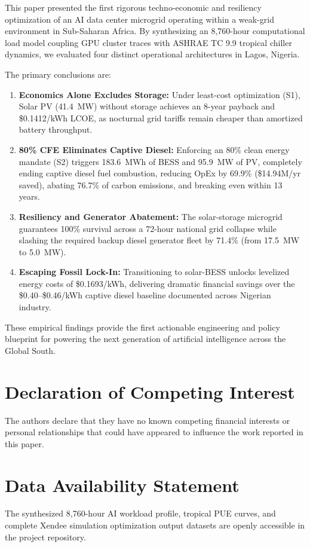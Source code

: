 \documentclass[12pt,3p,review]{elsarticle}
\begin{document}
This paper presented the first rigorous techno-economic and resiliency optimization of an AI data center microgrid operating within a weak-grid environment in Sub-Saharan Africa. By synthesizing an 8,760-hour computational load model coupling GPU cluster traces with ASHRAE TC 9.9 tropical chiller dynamics, we evaluated four distinct operational architectures in Lagos, Nigeria.

The primary conclusions are:
\begin{enumerate}
    \item \textbf{Economics Alone Excludes Storage:} Under least-cost optimization (S1), Solar PV (41.4~MW) without storage achieves an 8-year payback and \$0.1412/kWh LCOE, as nocturnal grid tariffs remain cheaper than amortized battery throughput.
    \item \textbf{80\% CFE Eliminates Captive Diesel:} Enforcing an 80\% clean energy mandate (S2) triggers 183.6~MWh of BESS and 95.9~MW of PV, completely ending captive diesel fuel combustion, reducing OpEx by 69.9\% (\$14.94M/yr saved), abating 76.7\% of carbon emissions, and breaking even within 13 years.
    \item \textbf{Resiliency and Generator Abatement:} The solar-storage microgrid guarantees 100\% survival across a 72-hour national grid collapse while slashing the required backup diesel generator fleet by 71.4\% (from 17.5~MW to 5.0~MW).
    \item \textbf{Escaping Fossil Lock-In:} Transitioning to solar-BESS unlocks levelized energy costs of \$0.1693/kWh, delivering dramatic financial savings over the \$0.40--\$0.46/kWh captive diesel baseline documented across Nigerian industry.
\end{enumerate}

These empirical findings provide the first actionable engineering and policy blueprint for powering the next generation of artificial intelligence across the Global South.

\section*{Declaration of Competing Interest}
The authors declare that they have no known competing financial interests or personal relationships that could have appeared to influence the work reported in this paper.

\section*{Data Availability Statement}
The synthesized 8,760-hour AI workload profile, tropical PUE curves, and complete Xendee simulation optimization output datasets are openly accessible in the project repository.



\end{document}
